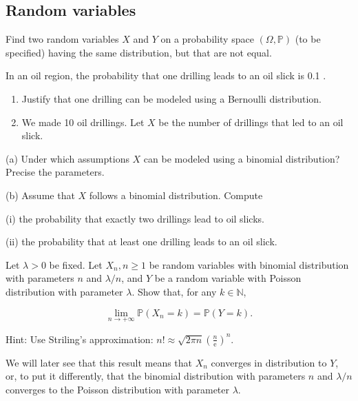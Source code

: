 \begin{center}
  \section*{Random variables}
\end{center}

\begin{Exercise}
  Find two random variables $X$ and $Y$ on a probability space $(\Omega, \mathbb{P})$ (to be specified) having the same distribution, but that are not equal.
\end{Exercise}

\begin{Exercise}
  In an oil region, the probability that one drilling leads to an oil slick is 0.1 .

  \begin{enumerate}
    \item Justify that one drilling can be modeled using a Bernoulli distribution.

    \item We made 10 oil drillings. Let $X$ be the number of drillings that led to an oil slick.

  \end{enumerate}

  (a) Under which assumptions $X$ can be modeled using a binomial distribution? Precise the parameters.

  (b) Assume that $X$ follows a binomial distribution. Compute

  (i) the probability that exactly two drillings lead to oil slicks.

  (ii) the probability that at least one drilling leads to an oil slick.
\end{Exercise}

\begin{Exercise}
  Let $\lambda>0$ be fixed. Let $X_{n}, n \geq 1$ be random variables with binomial distribution with parameters $n$ and $\lambda / n$, and $Y$ be a random variable with Poisson distribution with parameter $\lambda$. Show that, for any $k \in \mathbb{N}$,

  $$
    \lim _{n \rightarrow+\infty} \mathbb{P}\left(X_{n}=k\right)=\mathbb{P}(Y=k) .
  $$

  Hint: Use Striling's approximation: $n ! \approx \sqrt{2 \pi n}\left(\frac{n}{\mathrm{e}}\right)^{n}$.

  We will later see that this result means that $X_{n}$ converges in distribution to $Y$, or, to put it differently, that the binomial distribution with parameters $n$ and $\lambda / n$ converges to the Poisson distribution with parameter $\lambda$.
\end{Exercise}
